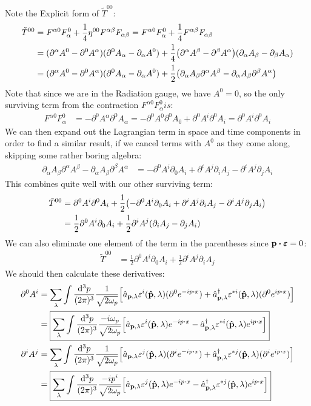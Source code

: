 \documentclass[12pt]{article}
\newcommand{\D}{\partial}
\newcommand{\veps}{\varepsilon}
\begin{document}
Note the Explicit form of $\tilde{T}^{00}$:
\begin{align*}
  \tilde{T}^{00}&=
  F^{\alpha0}F^0_\alpha+\frac14\eta^{00}F^{\alpha\beta}F_{\alpha\beta}
  =F^{\alpha0}F^0_\alpha+\frac14F^{\alpha\beta}F_{\alpha\beta}\\
  &=(\D^\alpha A^0-\D^0A^\alpha)(\D^0A_\alpha-\D_\alpha A^0)
  +\frac14
  \qty(\D^\alpha A^\beta-\D^\beta A^\alpha)
  \qty(\D_\alpha A_\beta-\D_\beta A_\alpha)\\
  &=(\D^\alpha A^0-\D^0A^\alpha)(\D^0A_\alpha-\D_\alpha A^0)
  +\frac12\qty(\D_\alpha A_\beta\D^\alpha A^\beta
  -\D_\alpha A_\beta\D^\beta A^\alpha)
\end{align*}
Note that since we are in the Radiation gauge, we have $A^0=0$, so the only surviving term from the contraction $F^{\alpha0}F_{\alpha}^0 is$:
\begin{align*}
  F^{\alpha0}F^0_\alpha&=-\D^0A^\alpha\D^0A_\alpha
  =-\D^0A^0\D^0A_0+\D^0A^i\D^0A_i
  =\D^0A^i\D^0A_i
\end{align*}
We can then expand out the Lagrangian term in space and time components in order to find a similar result, if we cancel terms with $A^0$ as they come along, skipping some rather boring algebra:
\begin{align*}
  \D_\alpha A_\beta\D^\alpha A^\beta-\D_\alpha A_\beta\D^\beta A^\alpha
  &=-\D^0A^i\D_0A_i+\D^iA^j\D_iA_j-\D^iA^j\D_jA_i
\end{align*}
This combines quite well with our other surviving term:
\begin{align*}
  \tilde{T}^{00}&=\D^0A^i\D^0A_i
  +\frac12\qty(-\D^0A^i\D_0A_i+\D^iA^j\D_iA_j-\D^iA^j\D_jA_i)\\
  &=\frac12\D^0A^i\D_0A_i+\frac12\D^iA^j(\D_iA_j-\D_jA_i)
\end{align*}
We can also eliminate one element of the term in the parentheses since $\vb{p\vdot\bm\veps}=0$:
\begin{align*}
  \tilde{T}^{00}&=\frac12\D^0A^i\D_0A_i+\frac12\D^iA^j\D_iA_j
\end{align*}
We should then calculate these derivatives:
\begin{align*}
  \D^0A^i&=\sum_\lambda\int\frac{\dd[3]{p}}{(2\pi)^3}
  \frac1{\sqrt{2\omega_p}}
  \qty[\hat{a}_{\vb{p},\lambda}\veps^i(\vu{p},\lambda)(\D^0e^{-ip\vdot x})+
  \hat{a}^\dag_{\vb{p},\lambda}\veps^{*i}(\vu{p},\lambda)(\D^0e^{ip\vdot x})]\\
  &=\boxed{\sum_\lambda\int\frac{\dd[3]{p}}{(2\pi)^3}
  \frac{-i\omega_p}{\sqrt{2\omega_p}}
  \qty[\hat{a}_{\vb{p},\lambda}\veps^i(\vu{p},\lambda)e^{-ip\vdot x}-
  \hat{a}^\dag_{\vb{p},\lambda}\veps^{*i}(\vu{p},\lambda)e^{ip\vdot x}]}\\
  \D^iA^j&=\sum_\lambda\int\frac{\dd[3]{p}}{(2\pi)^3}
  \frac1{\sqrt{2\omega_p}}
  \qty[\hat{a}_{\vb{p},\lambda}\veps^j(\vu{p},\lambda)(\D^ie^{-ip\vdot x})+
  \hat{a}^\dag_{\vb{p},\lambda}\veps^{*j}(\vu{p},\lambda)(\D^ie^{ip\vdot x})]\\
  &=\boxed{\sum_\lambda\int\frac{\dd[3]{p}}{(2\pi)^3}
  \frac{-ip^i}{\sqrt{2\omega_p}}
  \qty[\hat{a}_{\vb{p},\lambda}\veps^j(\vu{p},\lambda)e^{-ip\vdot x}-
  \hat{a}^\dag_{\vb{p},\lambda}\veps^{*j}(\vu{p},\lambda)e^{ip\vdot x}]}
\end{align*}
\end{document}
